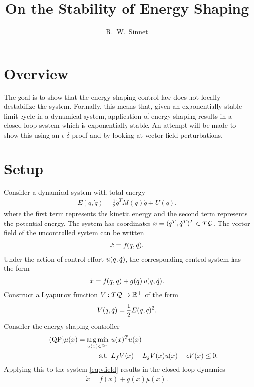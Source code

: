 \documentclass[twocolumn]{article}
\author{R.~W.~Sinnet}
\title{On the Stability of Energy Shaping}
\begin{document}
\maketitle

\section*{Overview}
The goal is to show that the energy shaping control law does not locally destabilize the system.
%
Formally, this means that, given an exponentially-stable limit cycle in a dynamical system, application of energy shaping results in a closed-loop system which is exponentially stable.
%
An attempt will be made to show this using an $\epsilon$-$\delta$ proof and by looking at vector field perturbations.

\section{Setup}

Consider a dynamical system with total energy
\begin{align*}
  E(q, \dot q) = \frac{1}{2} {\dot q}^{T} M(q) {\dot q} + U(q).
\end{align*}
where the first term represents the kinetic energy and the second term represents the potential energy.
%
The system has coordinates $x = (q^T, \dot{q}^T)^T \in T\mathcal{Q}$.
%
The vector field of the uncontrolled system can be written
\begin{align}
  {\dot x} = f(q, \dot{q}).
  \label{eq:vfield}
\end{align}
Under the action of control effort $u(q, \dot{q})$, the corresponding control system has the form
\begin{align}
  {\dot x} = f(q, \dot{q}) + g(q) \, u(q, \dot{q}).
  \label{eq:csys}
\end{align}
Construct a Lyapunov function $V : T\mathcal{Q} \to \mathbb{R}^{+}$ of the form
\begin{align}
  \label{eq:lyap}
  V(q, \dot{q}) = \frac{1}{2} E(q, \dot{q})^2.
\end{align}
Consider the energy shaping controller
\begin{align}
  \label{eq:es-qp} \tag {QP}
  \mu(x) = \operatorname*{arg\,min}_{u(x) \in \mathbb{R}^{n}} \ & u(x)^T u(x)\\
  \nonumber
  \mbox{s.t. } & L_{f} V(x) + L_{g} V(x) u(x) + \epsilon V(x) \leq 0.
\end{align}
Applying this to the system \eqref{eq:vfield} results in the closed-loop dynamics
\begin{align*}
  {\dot x} = f(x) + g(x) \mu(x).
\end{align*}
\end{document}
